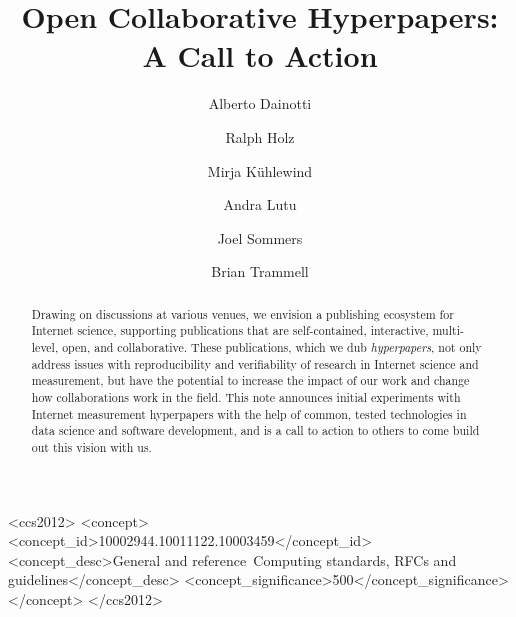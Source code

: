 \documentclass[sigconf]{acmart}
\begin{document}
\title{Open Collaborative Hyperpapers: A Call to Action}

\author{Alberto Dainotti}

\author{Ralph Holz}

\author{Mirja K\"uhlewind}

\author{Andra Lutu}

\author{Joel Sommers}

\author{Brian Trammell}


\begin{abstract}
	Drawing on discussions at various venues, we envision a publishing ecosystem
	for Internet science, supporting publications that are self-contained,
	interactive, multi-level, open, and collaborative. These publications, which
	we dub \emph{hyperpapers}, not only address issues with reproducibility and
	verifiability of research in Internet science and measurement, but have the
	potential to increase the impact of our work and change how collaborations
	work in the field. This note announces initial experiments with Internet
	measurement hyperpapers with the help of common, tested technologies in data
	science and software development, and is a call to action to others to come
	build out this vision with us.
\end{abstract}

\begin{CCSXML}
<ccs2012>
<concept>
<concept_id>10002944.10011122.10003459</concept_id>
<concept_desc>General and reference~Computing standards, RFCs and guidelines</concept_desc>
<concept_significance>500</concept_significance>
</concept>
</ccs2012>
\end{CCSXML}



\maketitle
\end{document}
